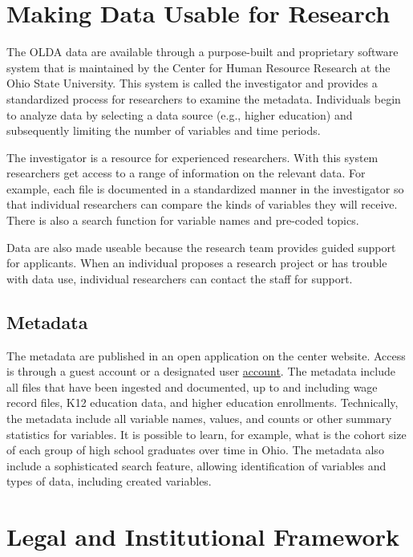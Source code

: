 \hypertarget{making-data-usable-for-research-1}{%
\section{Making Data Usable for Research}\label{making-data-usable-for-research-1}}

The OLDA data are available through a purpose-built and proprietary software system that is maintained by the Center for Human Resource Research at the Ohio State University. This system is called the investigator and provides a standardized process for researchers to examine the metadata. Individuals begin to analyze data by selecting a data source (e.g., higher education) and subsequently limiting the number of variables and time periods.

The investigator is a resource for experienced researchers. With this system researchers get access to a range of information on the relevant data. For example, each file is documented in a standardized manner in the investigator so that individual researchers can compare the kinds of variables they will receive. There is also a search function for variable names and pre-coded topics.

Data are also made useable because the research team provides guided support for applicants. When an individual proposes a research project or has trouble with data use, individual researchers can contact the staff for support.

\hypertarget{metadata}{%
\subsection{Metadata}\label{metadata}}

The metadata are published in an open application on the center website. Access is through a guest account or a designated user \href{https://www.chrr.ohio-state.edu/investigator/pages/login}{account}. The metadata include all files that have been ingested and documented, up to and including wage record files, K12 education data, and higher education enrollments. Technically, the metadata include all variable names, values, and counts or other summary statistics for variables. It is possible to learn, for example, what is the cohort size of each group of high school graduates over time in Ohio. The metadata also include a sophisticated search feature, allowing identification of variables and types of data, including created variables.

\hypertarget{legal-and-institutional-framework-1}{%
\section{Legal and Institutional Framework}\label{legal-and-institutional-framework-1}}


